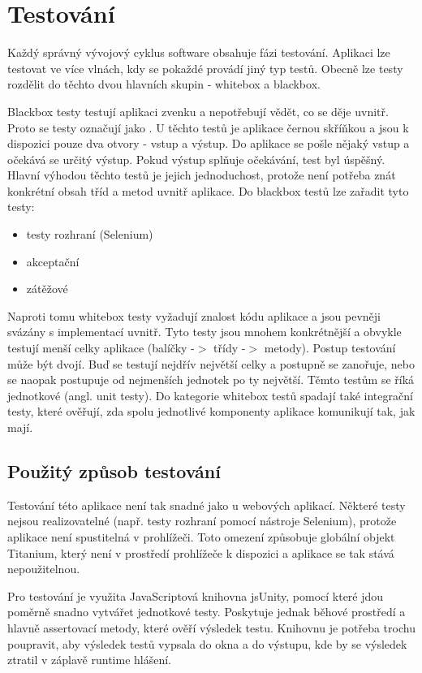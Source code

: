 \chapter{Testování}

Každý správný vývojový cyklus software obsahuje fázi testování. Aplikaci lze testovat ve více vlnách, kdy se pokaždé provádí jiný typ testů. Obecně lze testy rozdělit do těchto dvou hlavních skupin - whitebox a blackbox.

Blackbox testy testují aplikaci zvenku a nepotřebují vědět, co se děje uvnitř. Proto se testy označují jako . U těchto testů je aplikace černou skříňkou a jsou k dispozici pouze dva otvory - vstup a výstup. Do aplikace se pošle nějaký vstup a očekává se určitý výstup. Pokud výstup splňuje očekávání, test byl úspěšný. Hlavní výhodou těchto testů je jejich jednoduchost, protože není potřeba znát konkrétní obsah tříd a metod uvnitř aplikace. Do blackbox testů lze zařadit tyto testy:

\begin{itemize}
\item testy rozhraní (Selenium)
\item akceptační
\item zátěžové
\end{itemize}

Naproti tomu whitebox testy vyžadují znalost kódu aplikace a jsou pevněji svázány s implementací uvnitř. Tyto testy jsou mnohem konkrétnější a obvykle testují menší celky aplikace (balíčky -$>$ třídy -$>$ metody). Postup testování může být dvojí. Buď se testují nejdřív největší celky a postupně se zanořuje, nebo se naopak postupuje od nejmenších jednotek po ty největší. Těmto testům se říká jednotkové (angl. unit testy). Do kategorie whitebox testů spadají také integrační testy, které ověřují, zda spolu jednotlivé komponenty aplikace komunikují tak, jak mají.

\section{Použitý způsob testování}

Testování této aplikace není tak snadné jako u webových aplikací. Některé testy nejsou realizovatelné (např. testy rozhraní pomocí nástroje Selenium), protože aplikace není spustitelná v prohlížeči. Toto omezení způsobuje globální objekt Titanium, který není v prostředí prohlížeče k dispozici a aplikace se tak stává nepoužitelnou.

Pro testování je využita JavaScriptová knihovna jsUnity, pomocí které jdou poměrně snadno vytvářet jednotkové testy. Poskytuje jednak běhové prostředí a hlavně assertovací metody, které ověří výsledek testu. Knihovnu je potřeba trochu poupravit, aby výsledek testů vypsala do okna a do výstupu, kde by se výsledek ztratil v záplavě runtime hlášení.

